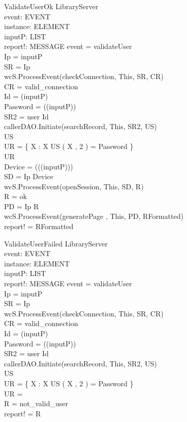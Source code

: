 \begin{schema}{ValidateUserOk}
\Delta LibraryServer \\
event: EVENT \\
instance: ELEMENT \\
inputP: LIST \\
report!: MESSAGE
\where event = validateUser \\
Ip = \head inputP \\
SR = \lseq Ip \rseq \\ 
wcS.ProcessEvent(checkConnection, This, SR, CR) \\
CR = valid\_connection \\
Id = \head (\tail inputP) \\
Password = \head (\tail (\tail inputP)) \\
SR2 = \lseq user Id \rseq \\
callerDAO.Initiate(searchRecord, This, SR2, US) \\
US \neq \emptyset \\
UR = \{ X : \nat \bbar X \mem US \land \nth( X , 2 ) = Password \} \\
UR \neq \emptyset \\ 
Device = \head (\tail (\tail (\tail inputP))) \\
SD = \lseq Ip Device \rseq \\
wcS.ProcessEvent(openSession, This, SD, R) \\
R = ok \\
PD = \lseq Ip R \rseq \\
wcS.ProcessEvent(generatePage , This, PD, RFormatted) \\
report! = RFormatted 
\end{schema}

\begin{schema}{ValidateUserFailed}
\Delta LibraryServer \\
event: EVENT \\
instance: ELEMENT \\
inputP: LIST \\
report!: MESSAGE
\where event = validateUser \\
Ip = \head inputP \\
SR = \lseq Ip \rseq \\ 
wcS.ProcessEvent(checkConnection, This, SR, CR) \\
CR = valid\_connection \\
Id = \head (\tail inputP) \\
Password = \head (\tail (\tail inputP)) \\
SR2 = \lseq user Id \rseq \\
callerDAO.Initiate(searchRecord, This, SR2, US) \\
US \neq \emptyset \\
UR = \{ X : \nat \bbar X \mem US \land \nth( X , 2 ) = Password \} \\
UR = \emptyset \\ 
R = not\_valid\_user \\
report! = R 
\end{schema}

